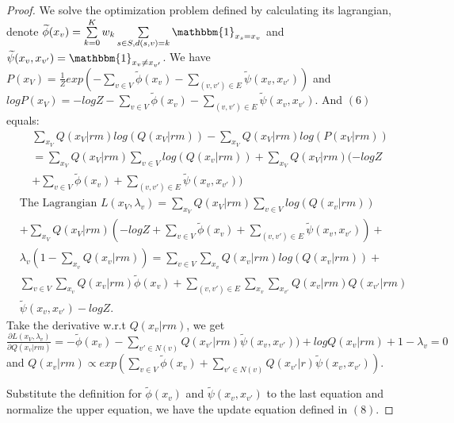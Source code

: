 \documentclass[conference]{IEEEtran}
\begin{document}
\begin{proof}
	We solve the optimization problem defined by calculating its lagrangian, denote $\widetilde{\phi}(x_{v})
	=\sum\limits_{k=0}^{K}w_{k} \sum\limits_{\substack{s\in S, d(s,v)=k}} \mathbbm{1}_{x_{s}=x_{v}}$ and $\widetilde{\psi}(x_{v},x_{v'})=\mathbbm{1}_{x_{v}\neq x_{v'}}$. We have $P(x_{V}) = \frac{1}{Z} exp(-\sum_{v\in V} \widetilde{\phi}(x_{v})-\sum_{(v,v')\in E} \widetilde{\psi}(x_{v},x_{v'}))$ and $log P(x_{V})=-logZ-\sum_{v\in V} \widetilde{\phi}(x_{v})-\sum_{(v,v')\in E} \widetilde{\psi}(x_{v},x_{v'})$.  And $(6)$ equals:
	 \begin{align*}
	  &\sum_{x_{V}} Q(x_{V}|rm)log(Q(x_{V}|rm))-\sum_{x_{V}} Q(x_{V}|rm)log(P(x_{V}|rm))\\
	  &= \sum_{x_{V}} Q(x_{V}|rm)\sum_{v\in V}log(Q(x_{v}|rm))+ \sum_{x_{V}}Q(x_{V}|rm)(-logZ \\&+ \sum_{v\in V} \widetilde{\phi}(x_{v})+\sum_{(v,v')\in E} \widetilde{\psi}(x_{v},x_{v'}))
     \end{align*}
     \begin{align*} 
     &\text{The Lagrangian } L(x_{V},\lambda_{v}) =  \sum_{x_{V}} Q(x_{V}|rm)\sum_{v\in V}log(Q(x_{v}|rm))\\& +\sum_{x_{V}}Q(x_{V}|rm)(-logZ + \sum_{v\in V} \widetilde{\phi}(x_{v})+\sum_{(v,v')\in E} \widetilde{\psi}(x_{v},x_{v'})) + \\& \lambda_{v} (1-\sum_{x_{v}}Q(x_{v}|rm)) = \sum_{v\in V} \sum_{x_{v}} Q(x_{v}|rm)log(Q(x_{v}|rm)) + \\&\sum_{v\in V}\sum_{x_{v}}Q(x_{v}|rm)\widetilde{\phi}(x_{v})+\sum_{(v,v')\in E}\sum_{x_{v}}\sum_{x_{v'}}Q(x_{v}|rm)Q(x_{v'}|rm)\\&\widetilde{\psi}(x_{v},x_{v'})-logZ.
     \end{align*}
      Take the derivative w.r.t $Q(x_{v}|rm)$, we get $\frac{\partial L(x_{V},\lambda_{v})}{\partial Q(x_{v}|rm)} = -\widetilde{\phi}(x_{v}) - \sum_{v'\in N(v)} Q(x_{v'}|rm) \widetilde{\psi}(x_{v},x_{v'})) +logQ(x_{v}|rm) + 1 -\lambda_{v} = 0$ and $Q(x_{v}|rm)\propto exp(\sum_{v\in V} \widetilde{\phi}(x_{v}) + \sum_{v'\in N(v)} Q(x_{v'}|r)\widetilde{\psi}(x_{v},x_{v'}))$. 
     
     Substitute the definition for $\widetilde{\phi}(x_{v})$ and $\widetilde{\psi}(x_{v},x_{v'})$ to the last equation and normalize the upper equation, we have the update equation defined in $(8)$.
\end{proof}
\end{document}
